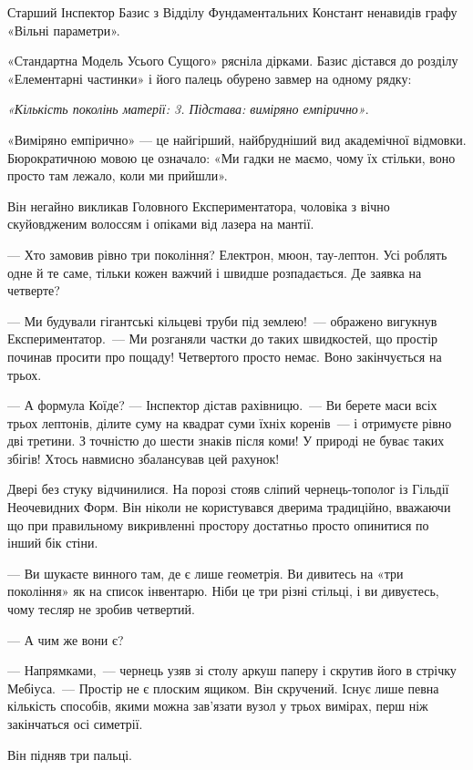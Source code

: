 \documentclass[12pt, a4paper, openany]{book}
\begin{document}
\begin{terrybox}
Старший Інспектор Базис з Відділу Фундаментальних Констант ненавидів графу «Вільні параметри».

«Стандартна Модель Усього Сущого» рясніла дірками. Базис дістався до розділу «Елементарні частинки» і його палець обурено завмер на одному рядку:

\textit{«Кількість поколінь матерії: 3. Підстава: виміряно емпірично»}.

«Виміряно емпірично» — це найгірший, найбрудніший вид академічної відмовки. Бюрократичною мовою це означало: «Ми гадки не маємо, чому їх стільки, воно просто там лежало, коли ми прийшли».

Він негайно викликав Головного Експериментатора, чоловіка з вічно скуйовдженим волоссям і опіками від лазера на мантії.

--- Хто замовив рівно три покоління? Електрон, мюон, тау-лептон. Усі роблять одне й те саме, тільки кожен важчий і швидше розпадається. Де заявка на четверте?

--- Ми будували гігантські кільцеві труби під землею!~--- ображено вигукнув Експериментатор.~--- Ми розганяли частки до таких швидкостей, що простір починав просити про пощаду! Четвертого просто немає. Воно закінчується на трьох.

--- А формула Коїде? — Інспектор дістав рахівницю.~--- Ви берете маси всіх трьох лептонів, ділите суму на квадрат суми їхніх коренів~--- і отримуєте рівно дві третини. З точністю до шести знаків після коми! У природі не буває таких збігів! Хтось навмисно збалансував цей рахунок!

\medskip
Двері без стуку відчинилися. На порозі стояв сліпий чернець-тополог із Гільдії Неочевидних Форм. Він ніколи не користувався дверима традиційно, вважаючи що при правильному викривленні простору достатньо просто опинитися по інший бік стіни.

--- Ви шукаєте винного там, де є лише геометрія. Ви дивитесь на «три покоління» як на список інвентарю. Ніби це три різні стільці, і ви дивуєтесь, чому тесляр не зробив четвертий.

--- А чим же вони є?

--- Напрямками,~--- чернець узяв зі столу аркуш паперу і скрутив його в стрічку Мебіуса.~--- Простір не є плоским ящиком. Він скручений. Існує лише певна кількість способів, якими можна зав'язати вузол у трьох вимірах, перш ніж закінчаться осі симетрії.

Він підняв три пальці.


\end{terrybox}
\end{document}
